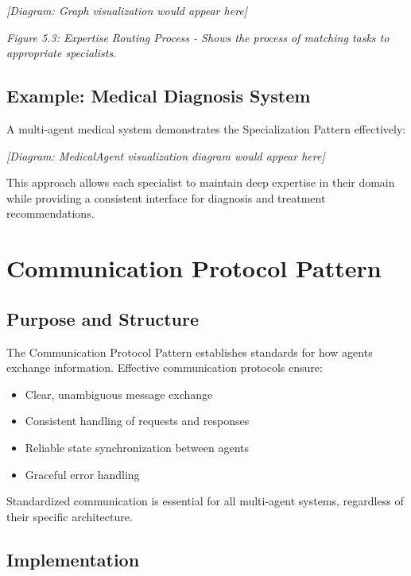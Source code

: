 \documentclass[11pt,oneside]{book}
\providecommand{\tightlist}{%
  \setlength{\itemsep}{0pt}\setlength{\parskip}{0pt}}
\begin{document}
\emph{{[}Diagram: Graph visualization would appear here{]}}

\emph{Figure 5.3: Expertise Routing Process - Shows the process of
matching tasks to appropriate specialists.}

\subsection{Example: Medical Diagnosis
System}\label{example-medical-diagnosis-system}

A multi-agent medical system demonstrates the Specialization Pattern
effectively:

\emph{{[}Diagram: MedicalAgent visualization diagram would appear
here{]}}

This approach allows each specialist to maintain deep expertise in their
domain while providing a consistent interface for diagnosis and
treatment recommendations.

\section{Communication Protocol
Pattern}\label{communication-protocol-pattern}

\subsection{Purpose and Structure}\label{purpose-and-structure-5}

The Communication Protocol Pattern establishes standards for how agents
exchange information. Effective communication protocols ensure:

\begin{itemize}
\tightlist
\item
  Clear, unambiguous message exchange
\item
  Consistent handling of requests and responses
\item
  Reliable state synchronization between agents
\item
  Graceful error handling
\end{itemize}

Standardized communication is essential for all multi-agent systems,
regardless of their specific architecture.

\subsection{Implementation}\label{implementation-4}
\end{document}
